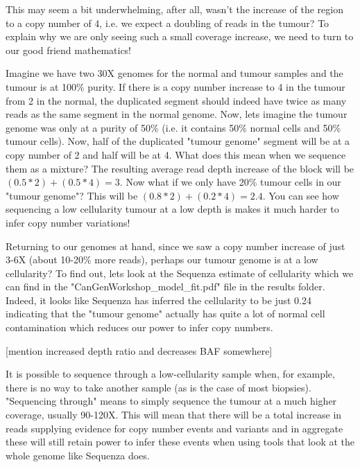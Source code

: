 This may seem a bit underwhelming, after all, wasn't the increase of the region to a copy number of 4, i.e. we expect a doubling of reads in the tumour? To explain why we are only seeing such a small coverage increase, we need to turn to our good friend mathematics!

Imagine we have two 30X genomes for the normal and tumour samples and the tumour is at 100\% purity. If there is a copy number increase to 4 in the tumour from 2 in the normal, the duplicated segment should indeed have twice as many reads as the same segment in the normal genome. Now, lets imagine the tumour genome was only at a purity of 50\% (i.e. it contains 50\% normal cells and 50\% tumour cells). Now, half of the duplicated "tumour genome" segment will be at a copy number of 2 and half will be at 4. What does this mean when we sequence them as a mixture? The resulting average read depth increase of the block will be $(0.5*2)+(0.5*4) = 3$. Now what if we only have 20\% tumour cells in our "tumour genome"? This will be $(0.8*2)+(0.2*4) = 2.4$. You can see how sequencing a low cellularity tumour at a low depth is makes it much harder to infer copy number variations!

Returning to our genomes at hand, since we saw a copy number increase of just 3-6X (about 10-20\% more reads), perhaps our tumour genome is at a low cellularity? To find out, lets look at the Sequenza estimate of cellularity which we can find in the "CanGenWorkshop\_model\_fit.pdf" file in the results folder. Indeed, it looks like Sequenza has inferred the cellularity to be just 0.24 indicating that the "tumour genome" actually has quite a lot of normal cell contamination which reduces our power to infer copy numbers.

[mention increased depth ratio and decreases BAF somewhere]

\begin{note}
It is possible to sequence through a low-cellularity sample when, for example, there is no way to take another sample (as is the case of most biopsies). "Sequencing through" means to simply sequence the tumour at a much higher coverage, usually 90-120X. This will mean that there will be a total increase in reads supplying evidence for copy number events and variants and in aggregate these will still retain power to infer these events when using tools that look at the whole genome like Sequenza does.
\end{note}


